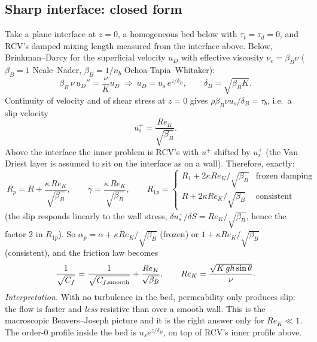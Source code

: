 \documentclass[10pt,a4paper]{article}
\newcommand{\Rp}{R_p}
\newcommand{\Rop}{R_{1p}}
\begin{document}
\subsection{Sharp interface: closed form}
Take a plane interface at $z=0$, a homogeneous bed below with $\tau_t=\tau_d=0$, and RCV's damped mixing length measured from the interface above. Below, Brinkman--Darcy for the superficial velocity $u_D$ with effective viscosity $\nu_e=\beta_B\nu$ ($\beta_B=1$ Neale--Nader, $\beta_B=1/n_b$ Ochoa-Tapia--Whitaker):
\begin{equation}
\beta_B\,\nu\,u_D''=\frac{\nu}{K}u_D\ \Rightarrow\ u_D=u_s\,e^{z/\delta_B},\qquad \delta_B=\sqrt{\beta_BK}.
\end{equation}
Continuity of velocity and of shear stress at $z=0$ gives $\rho\beta_B\nu u_s/\delta_B=\tau_b$, i.e.\ a slip velocity
\begin{equation}
u_s^+=\frac{Re_K}{\sqrt{\beta_B}} .
\end{equation}
Above the interface the inner problem is RCV's with $u^+$ shifted by $u_s^+$ (the Van Driest layer is assumed to sit on the interface as on a wall). Therefore, exactly:
\begin{equation}
\boxed{\ \Rp=R+\frac{\kappa\,Re_K}{\sqrt{\beta_B}},\qquad \gamma=\frac{\kappa\,Re_K}{\sqrt{\beta_B}},\qquad
\Rop=\begin{cases}R_1+2\kappa Re_K/\sqrt{\beta_B}&\text{frozen damping}\\ R+2\kappa Re_K/\sqrt{\beta_B}&\text{consistent}\end{cases}\ }
\end{equation}
(the slip responds linearly to the wall stress, $\delta u_s^+/\delta S=Re_K/\sqrt{\beta_B}$, hence the factor 2 in $\Rop$). So $\alpha_p=\alpha+\kappa Re_K/\sqrt{\beta_B}$ (frozen) or $1+\kappa Re_K/\sqrt{\beta_B}$ (consistent), and the friction law becomes
\begin{equation}
\frac{1}{\sqrt{C_f}}=\frac{1}{\sqrt{C_{f,\rm smooth}}}+\frac{Re_K}{\sqrt{\beta_B}},\qquad Re_K=\frac{\sqrt{K\,gh\sin\theta}}{\nu}.
\end{equation}
\emph{Interpretation.} With no turbulence in the bed, permeability only produces slip: the flow is faster and \emph{less} resistive than over a smooth wall. This is the macroscopic Beavers--Joseph picture and it is the right answer only for $Re_K\ll1$. The order-0 profile inside the bed is $u_s e^{z/\delta_B}$, on top of RCV's inner profile above.
\end{document}
